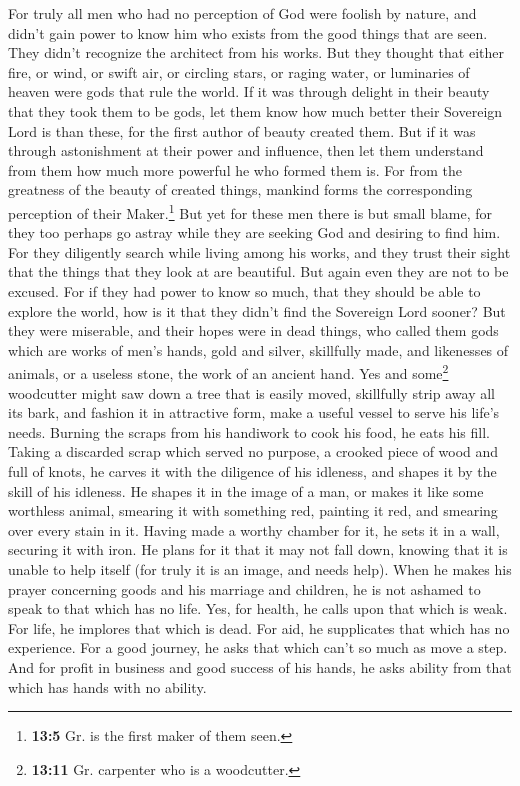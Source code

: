  For truly all men who had no perception of God were
foolish by nature, and didn't gain power to know him who exists from the
good things that are seen. They didn't recognize the architect from his
works.  But they thought that either fire, or wind, or
swift air, or circling stars, or raging water, or luminaries of heaven
were gods that rule the world.  If it was through delight
in their beauty that they took them to be gods, let them know how much
better their Sovereign Lord is than these, for the first author of
beauty created them.  But if it was through astonishment
at their power and influence, then let them understand from them how
much more powerful he who formed them is.  For from the
greatness of the beauty of created things, mankind forms the
corresponding perception of their Maker.\footnote{\textbf{13:5} Gr. is
  the first maker of them seen.}  But yet for these men
there is but small blame, for they too perhaps go astray while they are
seeking God and desiring to find him.  For they diligently
search while living among his works, and they trust their sight that the
things that they look at are beautiful.  But again even
they are not to be excused.  For if they had power to know
so much, that they should be able to explore the world, how is it that
they didn't find the Sovereign Lord sooner?  But they
were miserable, and their hopes were in dead things, who called them
gods which are works of men's hands, gold and silver, skillfully made,
and likenesses of animals, or a useless stone, the work of an ancient
hand.  Yes and some\footnote{\textbf{13:11} Gr. carpenter
  who is a woodcutter.} woodcutter might saw down a tree that is easily
moved, skillfully strip away all its bark, and fashion it in attractive
form, make a useful vessel to serve his life's needs. 
Burning the scraps from his handiwork to cook his food, he eats his
fill.  Taking a discarded scrap which served no purpose,
a crooked piece of wood and full of knots, he carves it with the
diligence of his idleness, and shapes it by the skill of his idleness.
He shapes it in the image of a man,  or makes it like
some worthless animal, smearing it with something red, painting it red,
and smearing over every stain in it.  Having made a
worthy chamber for it, he sets it in a wall, securing it with iron.
 He plans for it that it may not fall down, knowing that
it is unable to help itself (for truly it is an image, and needs help).
 When he makes his prayer concerning goods and his
marriage and children, he is not ashamed to speak to that which has no
life.  Yes, for health, he calls upon that which is weak.
For life, he implores that which is dead. For aid, he supplicates that
which has no experience. For a good journey, he asks that which can't so
much as move a step.  And for profit in business and good
success of his hands, he asks ability from that which has hands with no
ability.

